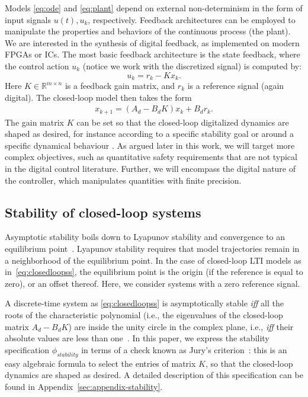 \documentclass[runningheads,a4paper]{llncs}
\begin{document}
Models \eqref{eq:ode} and \eqref{eq:plant} depend on external non-determinism in the form of input signals $u (t), u_k$, respectively. 
Feedback architectures can be employed to manipulate the properties and behaviors of the continuous process (the plant).   
We are interested in the synthesis of digital feedback, 
as implemented on modern FPGAs or ICs. 
The most basic feedback architecture is the state feedback, 
where the control action $u_k$ (notice we work with the discretized signal) is computed by: 
%
\begin{equation}
\label{eq:controlaction}
u_k = r_{k} - K x_k. 
\end{equation}
%
Here $K \in \mathbb{R}^{m \times n}$ is a feedback gain matrix, 
and $r_{k}$ is a reference signal (again digital).   
%
The closed-loop model then takes the form 
\begin{align}
\label{eq:closedloopss}
x_{k+1} = ( A_d - B_d K ) x_k + B_d r_k.
\end{align}
The gain matrix $K$ can be set so that the closed-loop digitalized dynamics are shaped as desired, 
for instance according to a specific stability goal or around a specific dynamical behaviour \cite{astrom1997computer}. 
As argued later in this work, we will target more complex objectives, such as quantitative safety requirements that are not typical in the digital control literature. 
Further, we will encompass the digital nature of the controller, which manipulates quantities with finite precision. 

\subsection{Stability of closed-loop systems}
\label{ssec:stability}


Asymptotic stability boils down to Lyapunov stability and convergence to an
equilibrium point~\cite{Astrom08}.  Lyapunov stability requires that model
trajectories remain in a neighborhood of the equilibrium point.  In the case
of closed-loop LTI models as in~\eqref{eq:closedloopss}, the equilibrium
point is the origin (if the reference is equal to zero), or an offset
thereof.  Here, we consider systems with a zero reference signal.

A discrete-time system as \eqref{eq:closedloopss} is asymptotically stable
\textit{iff} all the roots of the characteristic polynomial (i.e., the
eigenvalues of the closed-loop matrix $A_d - B_d K$) are inside the unity
circle in the complex plane, i.e., \textit{iff} their absolute values are
less than one~\cite{astrom1997computer}.  In this paper, we express the
stability specification $\phi_{stability}$ in terms of a check known as
Jury's criterion~\cite{fadali}: this is an easy algebraic formula to select
the entries of matrix $K$, so that the closed-loop dynamics are shaped as
desired.  A detailed description of this specification can be found in
Appendix~\ref{sec:appendix-stability}.
\end{document}
